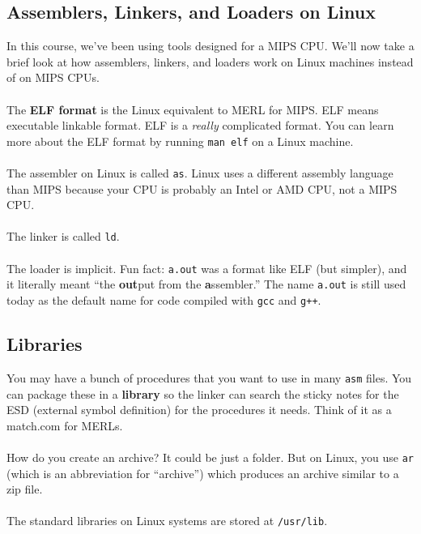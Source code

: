 \documentclass[]{article}
\theoremstyle{definition}
\newcommand{\lecture}[1]{\marginpar{{\footnotesize $\leftarrow$ \underline{#1}}}}
\begin{document}
			\subsection{Assemblers, Linkers, and Loaders on Linux} \lecture{February 1, 2013}
				In this course, we've been using tools designed for a MIPS CPU. We'll now take a brief look at how assemblers, linkers, and loaders work on Linux machines instead of on MIPS CPUs.
				\\ \\
				The \textbf{ELF format} is the Linux equivalent to MERL for MIPS. ELF means executable linkable format. ELF is a \emph{really} complicated format. You can learn more about the ELF format by running \verb+man elf+ on a Linux machine.
				\\ \\
				The assembler on Linux is called \verb+as+. Linux uses a different assembly language than MIPS because your CPU is probably an Intel or AMD CPU, not a MIPS CPU.
				\\ \\
				The linker is called \verb+ld+.
				\\ \\
				The loader is implicit. Fun fact: \verb+a.out+ was a format like ELF (but simpler), and it literally meant ``the \textbf{out}put from the \textbf{a}ssembler.'' The name \verb+a.out+ is still used today as the default name for code compiled with \verb|gcc| and \verb|g++|.
			\subsection{Libraries}
				You may have a bunch of procedures that you want to use in many \verb+asm+ files. You can package these in a \textbf{library} so the linker can search the sticky notes for the ESD (external symbol definition) for the procedures it needs. Think of it as a match.com for MERLs.
				\\ \\
				How do you create an archive? It could be just a folder. But on Linux, you use \verb+ar+ (which is an abbreviation for ``archive'') which produces an archive similar to a zip file.
				\\ \\
				The standard libraries on Linux systems are stored at \verb+/usr/lib+.
				
\end{document}

